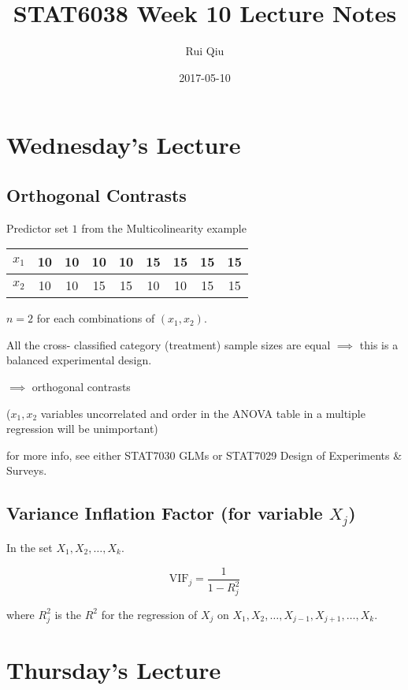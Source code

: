 \documentclass[a4paper, 11pt, twoside]{article}
\begin{document}
\title{STAT6038 Week 10 Lecture Notes}
\author{Rui Qiu}
\date{2017-05-10}

\maketitle

\section{Wednesday's Lecture}

\subsection{Orthogonal Contrasts}

Predictor set $1$ from the Multicolinearity example

\begin{table}[htbp!] 
	\centering
	\begin{tabular}{|c|c|c|c|c|c|c|c|c|}
		\hline
		$x_1$ & 10 & 10 & 10 & 10 & 15 & 15 & 15 & 15 \\
		\hline
		$x_2$ & 10 & 10 & 15 & 15 & 10 & 10 & 15 & 15 \\
		\hline
	\end{tabular}
\end{table}

$n=2$ for each combinations of $(x_1, x_2)$.

All the cross- classified category (treatment) sample sizes are equal $\implies$ this is a balanced experimental design.

$\implies$ orthogonal contrasts

($x_1, x_2$ variables uncorrelated and order in the ANOVA table in a multiple regression will be unimportant)

for more info, see either STAT7030 GLMs or STAT7029 Design of Experiments \& Surveys.\\

\subsection{Variance Inflation Factor (for variable $X_j$)}

In the set $X_1, X_2,\dots, X_k$.

\[\text{VIF}_j=\frac{1}{1-R_j^2}\]

where $R_j^2$ is the $R^2$ for the regression of $X_j$ on $X_1,X_2,\dots,X_{j-1}, X_{j+1},\dots, X_k.$

\section{Thursday's Lecture}
\end{document}
